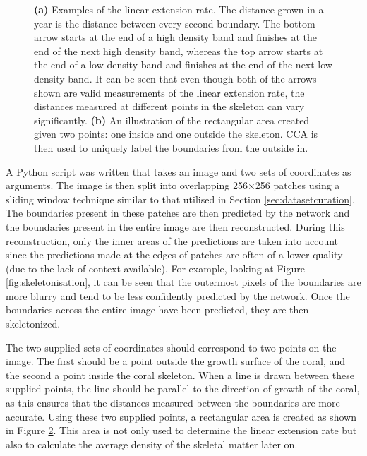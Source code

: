\begin{figure}[t]
\begin{subfigure}[t]{0.49\textwidth}
        \caption{}
        \label{fig:calcificationrect}
    \end{subfigure}
    \caption{\textbf{(a)} Examples of the linear extension rate. The distance grown in a year is the distance between every second boundary. The bottom arrow starts at the end of a high density band and finishes at the end of the next high density band, whereas the top arrow starts at the end of a low density band and finishes at the end of the next low density band. It can be seen that even though both of the arrows shown are valid measurements of the linear extension rate, the distances measured at different points in the skeleton can vary significantly. \textbf{(b)} An illustration of the rectangular area created given two points: one inside and one outside the skeleton. CCA is then used to uniquely label the boundaries from the outside in.}
\end{figure}

A Python script was written that takes an image and two sets of coordinates as arguments. The image is then split into overlapping 256$\times$256 patches using a sliding window technique similar to that utilised in Section \ref{sec:datasetcuration}. The boundaries present in these patches are then predicted by the network and the boundaries present in the entire image are then reconstructed. During this reconstruction, only the inner areas of the predictions are taken into account since the predictions made at the edges of patches are often of a lower quality (due to the lack of context available). For example, looking at Figure \ref{fig:skeletonisation}, it can be seen that the outermost pixels of the boundaries are more blurry and tend to be less confidently predicted by the network. Once the boundaries across the entire image have been predicted, they are then skeletonized.

The two supplied sets of coordinates should correspond to two points on the image. The first should be a point outside the growth surface of the coral, and the second a point inside the coral skeleton. When a line is drawn between these supplied points, the line should be parallel to the direction of growth of the coral, as this ensures that the distances measured between the boundaries are more accurate. Using these two supplied points, a rectangular area is created as shown in Figure \ref{fig:calcificationrect}. This area is not only used to determine the linear extension rate but also to calculate the average density of the skeletal matter later on.

